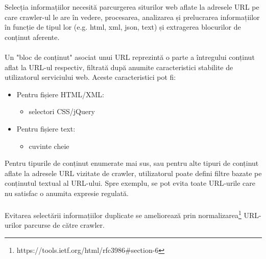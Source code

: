 \newcommand{\mimeDescription}{https://www.iana.org/assignments/media-types/media-types.xhtml}
\newcommand{\urlNormalization}{https://tools.ietf.org/html/rfc3986\#section-6}

Selecția informațiilor necesită parcurgerea siturilor web aflate la adresele URL pe care crawler-ul le are în vedere, procesarea, analizarea și prelucrarea informațiilor în funcție de tipul lor (e.g. html, xml, json, text) și extragerea blocurilor de conținut aferente.
\\
\\
Un "bloc de conținut" asociat unui URL reprezintă o parte a întregului conținut aflat la URL-ul respectiv, filtrată după anumite caracteristici stabilite de utilizatorul serviciului web. Aceste caracteristici pot fi:

\begin{itemize}
	\item{Pentru fișiere HTML/XML:
		\begin{itemize}
			\item{selectori CSS/jQuery \cite{css-selectors}}
		\end{itemize}			
	}
	\item{Pentru fișiere text:
		\begin{itemize}
			\item{cuvinte cheie}
		\end{itemize}			
	}
\end{itemize}

\noindent
Pentru tipurile de conținut enumerate mai sus, sau pentru alte tipuri de conținut aflate la adresele URL vizitate de crawler, utilizatorul poate defini filtre bazate pe conținutul textual al URL-ului. Spre exemplu, se pot evita toate URL-urile care nu satisfac o anumita expresie regulată. %
\\
\\
Evitarea selectării informațiilor duplicate se ameliorează prin normalizarea\footnote{\urlNormalization} URL-urilor parcurse de către crawler.
